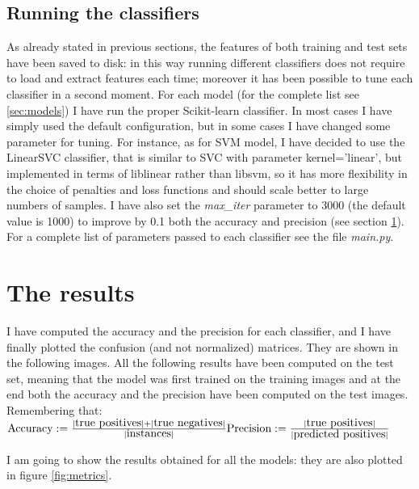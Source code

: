 \documentclass[12pt]{article}
\begin{document}
\subsection{Running the classifiers}
As already stated in previous sections, the features of both training and test sets have been saved to disk: in this way running different classifiers does not require to load and extract features each time; moreover it has been possible to tune each classifier in a second moment.
For each model (for the complete list see \ref{sec:models}) I have run the proper Scikit-learn classifier. In most cases I have simply used the default configuration, but in some cases I have changed some parameter for tuning. For instance, as for SVM model, I have decided to use the LinearSVC classifier, that is similar to SVC with parameter kernel='linear', but implemented in terms of liblinear rather than libsvm, so it has more flexibility in the choice of penalties and loss functions and should scale better to large numbers of samples. I have also set the \textit{max\_iter} parameter to 3000 (the default value is 1000) to improve by 0.1 both the accuracy and precision (see section \ref{sec:results}).
For a complete list of parameters passed to each classifier see the file \textit{main.py}.

\section{The results}
\label{sec:results}
I have computed the accuracy and the precision for each classifier, and I have finally plotted the confusion (and not normalized) matrices. They are shown in the following images. All the following results have been computed on the test set, meaning that the model was first trained on the training images and at the end both the accuracy and the precision have been computed on the test images. Remembering that:
$
\newline\newline
\mbox{Accuracy}:= \frac{|\mbox{true positives}| + |\mbox{true negatives}|}{|\mbox{instances}|}
\newline\newline
\mbox{Precision}:= \frac{|\mbox{true positives}|}{|\mbox{predicted positives}|}
\newline\newline
$

I am going to show the results obtained for all the models: they are also plotted in figure \ref{fig:metrics}.
\end{document}
